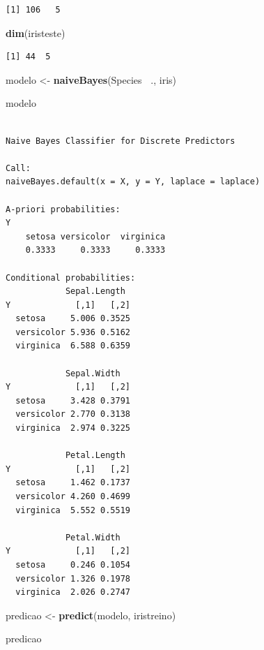 \documentclass[12pt,brazil,oneside]{book}
\newenvironment{Shaded}{\begin{snugshade}}{\end{snugshade}}
\newcommand{\KeywordTok}[1]{\textcolor[rgb]{0.13,0.29,0.53}{\textbf{#1}}}
\newcommand{\NormalTok}[1]{#1}
\newcommand{\OperatorTok}[1]{\textcolor[rgb]{0.81,0.36,0.00}{\textbf{#1}}}
\newcommand{\StringTok}[1]{\textcolor[rgb]{0.31,0.60,0.02}{#1}}
\begin{document}
\begin{verbatim}
[1] 106   5
\end{verbatim}

\begin{Shaded}
\begin{Highlighting}[]
\KeywordTok{dim}\NormalTok{(iristeste)}
\end{Highlighting}
\end{Shaded}

\begin{verbatim}
[1] 44  5
\end{verbatim}

\begin{Shaded}
\begin{Highlighting}[]
\NormalTok{modelo <-}\StringTok{ }\KeywordTok{naiveBayes}\NormalTok{(Species }\OperatorTok{~}\NormalTok{., iris)}

\NormalTok{modelo}
\end{Highlighting}
\end{Shaded}

\begin{verbatim}

Naive Bayes Classifier for Discrete Predictors

Call:
naiveBayes.default(x = X, y = Y, laplace = laplace)

A-priori probabilities:
Y
    setosa versicolor  virginica 
    0.3333     0.3333     0.3333 

Conditional probabilities:
            Sepal.Length
Y             [,1]   [,2]
  setosa     5.006 0.3525
  versicolor 5.936 0.5162
  virginica  6.588 0.6359

            Sepal.Width
Y             [,1]   [,2]
  setosa     3.428 0.3791
  versicolor 2.770 0.3138
  virginica  2.974 0.3225

            Petal.Length
Y             [,1]   [,2]
  setosa     1.462 0.1737
  versicolor 4.260 0.4699
  virginica  5.552 0.5519

            Petal.Width
Y             [,1]   [,2]
  setosa     0.246 0.1054
  versicolor 1.326 0.1978
  virginica  2.026 0.2747
\end{verbatim}

\begin{Shaded}
\begin{Highlighting}[]
\NormalTok{predicao <-}\StringTok{ }\KeywordTok{predict}\NormalTok{(modelo, iristreino)}

\NormalTok{predicao}
\end{Highlighting}
\end{Shaded}
\end{document}
